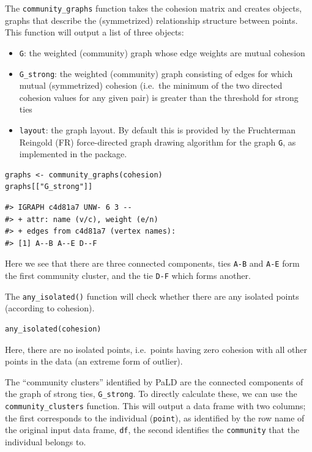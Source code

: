 The \texttt{community\_graphs} function takes the cohesion matrix and creates  objects, graphs that describe the (symmetrized) relationship structure between points. This function will output a list of three objects:

\begin{itemize}
\tightlist
\item
  \texttt{G}: the weighted (community) graph whose edge weights are mutual cohesion
\item
  \texttt{G\_strong}: the weighted (community) graph consisting of edges for which mutual (symmetrized) cohesion (i.e.~the minimum of the two directed cohesion values for any given pair) is greater than the threshold for strong ties
\item
  \texttt{layout}: the graph layout. By default this is provided by the Fruchterman Reingold (FR) force-directed graph drawing algorithm for the graph \texttt{G}, as implemented in the  package.
\end{itemize}

\begin{verbatim}
graphs <- community_graphs(cohesion)
graphs[["G_strong"]]
\end{verbatim}

\begin{verbatim}
#> IGRAPH c4d81a7 UNW- 6 3 --
#> + attr: name (v/c), weight (e/n)
#> + edges from c4d81a7 (vertex names):
#> [1] A--B A--E D--F
\end{verbatim}

Here we see that there are three connected components, ties \texttt{A-B} and \texttt{A-E} form the first community cluster, and the tie \texttt{D-F} which forms another.

The \texttt{any\_isolated()} function will check whether there are any isolated points (according to cohesion).

\begin{verbatim}
any_isolated(cohesion)
\end{verbatim}

\noindent Here, there are no isolated points, i.e.~points having zero cohesion with all other points in the data (an extreme form of outlier).

The ``community clusters'' identified by PaLD are the connected components of the graph of strong ties, \texttt{G\_strong}. To directly calculate these, we can use the \texttt{community\_clusters} function. This will output a data frame with two columns; the first corresponds to the individual (\texttt{point}), as identified by the row name of the original input data frame, \texttt{df}, the second identifies the \texttt{community} that the individual belongs to.


